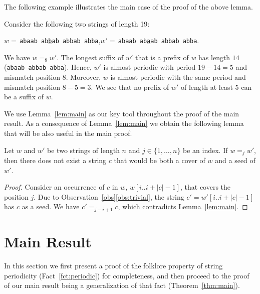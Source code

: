 \documentclass{article}
\begin{document}
  The following example illustrates the main case of the proof of the above lemma.

  \begin{example}
    Consider the following two strings of length 19:
    \begin{center}
      $w=\,$\texttt{abaab\,ab\underline{b}ab\,abbab\,abba},\quad $w'=\,$\texttt{abaab\,ab\underline{a}ab\,abbab\,abba}.
    \end{center}
    We have $w=_8w'$.
    The longest suffix of $w'$ that is a prefix of $w$ has length $14$ (\texttt{abaab\,abbab\,abba}).
    Hence, $w'$ is almost periodic with period $19-14=5$ and mismatch position 8.
    Moreover, $w$ is almost periodic with the same period and mismatch position $8-5=3$.
    We see that no prefix of $w'$ of length at least 5 can be a suffix of $w$.
  \end{example}

  We use Lemma~\ref{lem:main} as our key tool throughout the proof of the main result.
  As a consequence of Lemma~\ref{lem:main} we obtain the following lemma that will be also useful in the main proof.

  \begin{lemma}\label{lem:same_cover_seed}
    Let $w$ and $w'$ be two strings of length $n$ and $j \in \{1,\ldots,n\}$ be an index.
    If $w =_j w'$, then there does not exist a string $c$ that would be both a cover of $w$
    and a seed of $w'$.
  \end{lemma}
  \begin{proof}
    Consider an occurrence of $c$ in $w$, $w[i..i+|c|-1]$, that covers the position $j$.
    Due to Observation~\ref{obs}\ref{obs:trivial}, the string $c'=w'[i..i+|c|-1]$ has $c$ as a seed.
    We have $c' =_{j-i+1} c$, which contradicts Lemma~\ref{lem:main}.
  \end{proof}

  \section{Main Result}\label{sec:main}
  In this section we first present a proof of the folklore property of string periodicity
  (Fact~\ref{fct:periodic}) for completeness, and then proceed to the proof of our main result being a generalization
  of that fact (Theorem~\ref{thm:main}).
\end{document}
